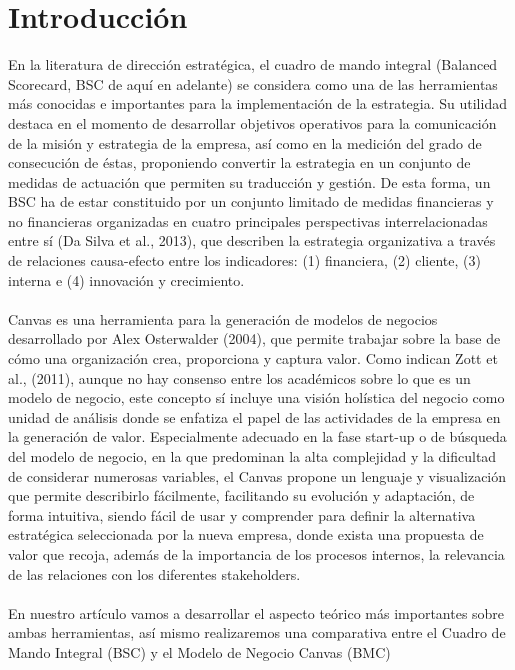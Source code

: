 \documentclass[preprint,12pt]{elsarticle}
\begin{document}
\section{Introducción}
En la literatura de dirección estratégica, el cuadro de mando integral (Balanced Scorecard, BSC de aquí en adelante) se considera como una de las herramientas más conocidas e importantes para la implementación de la estrategia. Su utilidad destaca en el momento de desarrollar objetivos operativos para la comunicación de la misión y estrategia de la empresa, así como en la medición del grado de consecución de éstas, proponiendo convertir la estrategia en un conjunto de medidas de actuación que permiten su traducción y gestión. De esta forma, un BSC ha de estar constituido por un conjunto limitado de medidas financieras y no financieras organizadas en cuatro principales perspectivas interrelacionadas entre sí (Da Silva et al., 2013), que describen la estrategia organizativa a través de relaciones causa-efecto entre los indicadores: (1) financiera, (2) cliente, (3) interna e (4) innovación y crecimiento.\\ \\

Canvas es una herramienta para la generación de modelos de negocios desarrollado por Alex Osterwalder (2004), que permite trabajar sobre la base de cómo una organización crea, proporciona y captura valor. Como indican Zott et al., (2011), aunque no hay consenso entre los académicos sobre lo que es un modelo de negocio, este concepto sí incluye una visión holística del negocio como unidad de análisis donde se enfatiza el papel de las actividades de la empresa en la generación de valor. Especialmente adecuado en la fase start-up o de búsqueda del modelo de negocio, en la que predominan la alta complejidad y la dificultad de considerar numerosas variables, el Canvas propone un lenguaje y visualización que permite describirlo fácilmente, facilitando su evolución y adaptación, de forma intuitiva, siendo fácil de usar y comprender para definir la alternativa estratégica seleccionada por la nueva empresa, donde exista una propuesta de valor que recoja, además de la importancia de los procesos internos, la relevancia de las relaciones con los diferentes stakeholders. \\ \\

En nuestro artículo vamos a desarrollar el aspecto teórico más importantes sobre ambas herramientas, así mismo realizaremos una comparativa entre el Cuadro de Mando Integral (BSC) y el Modelo de Negocio Canvas (BMC) 
\end{document}
